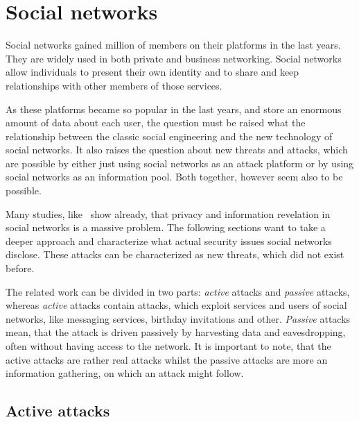 \section{Social networks}

Social networks gained million of members on their platforms in the last years.
They are widely used in both private and business networking. Social networks
allow individuals to present their own identity and to share and keep
relationships with other members of those services.

As these platforms became so popular in the last years, and store an enormous
amount of data about each user, the question must be raised what the
relationship between the classic social engineering and the new technology of
social networks. It also raises the question about new threats and attacks,
which are possible by either just using social networks as an attack platform
or by using social networks as an information pool. Both together, however seem
also to be possible.

Many studies, like~\cite{fraunhofer2008,gross2005} show already, that privacy
and information revelation in social networks is a massive problem. The following
sections want to take a deeper approach and characterize what actual security
issues social networks disclose. These attacks can be characterized as new
threats, which did not exist before. 

The related work can be divided in two parts: \textit{active} attacks and
\textit{passive} attacks, whereas \textit{active} attacks contain attacks,
which exploit services and users of social networks, like messaging services,
birthday invitations and other. \textit{Passive} attacks mean, that the attack
is driven passively by harvesting data and eavesdropping, often without having
access to the network. It is important to note, that the active attacks are
rather real attacks whilst the passive attacks are more an information
gathering, on which an attack might follow.

\subsection{Active attacks}
\label{subsection:active_attacks}

